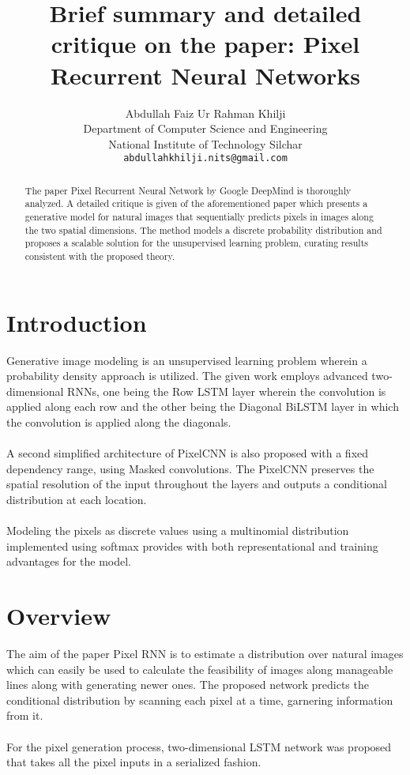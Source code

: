 \documentclass{article}
\title{Brief summary and detailed critique on the paper: Pixel Recurrent Neural Networks}
\author{%
  Abdullah Faiz Ur Rahman Khilji \\
  Department of Computer Science and Engineering\\
  National Institute of Technology Silchar\\
  \texttt{abdullahkhilji.nits@gmail.com} \\
}
\begin{document}

\maketitle
\begin{abstract}
	The paper Pixel Recurrent Neural Network by Google DeepMind is thoroughly analyzed. A detailed critique is given of the aforementioned paper which presents a generative model for natural images that sequentially predicts pixels in images along the two spatial dimensions. The method models a discrete probability distribution and proposes a scalable solution for the unsupervised learning problem, curating results consistent with the proposed theory.
\end{abstract}

\section{Introduction}
	Generative image modeling is an unsupervised learning problem wherein a probability density approach is utilized. The given work employs advanced two-dimensional RNNs, one being the Row LSTM layer wherein the convolution is applied along each row and the other being the Diagonal BiLSTM layer in which the convolution is applied along the diagonals.\\
	\\
	A second simplified architecture of PixelCNN is also proposed with a fixed dependency range, using Masked convolutions. The PixelCNN preserves the spatial resolution of the input throughout the layers and outputs a conditional distribution at each location.\\
	\\
	Modeling the pixels as discrete values using a multinomial distribution implemented using softmax provides with both representational and training advantages for the model.
	
	
	
	
	
\section{Overview}
The aim of the paper Pixel RNN is to estimate a distribution over natural images which can easily be used to calculate the feasibility of images along manageable lines along with generating newer ones. The proposed network predicts the conditional distribution by scanning each pixel at a time, garnering information from it.\\
\\
For the pixel generation process, two-dimensional LSTM network was proposed that takes all the pixel inputs in a serialized fashion.
\end{document}
